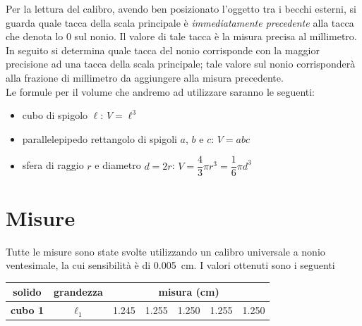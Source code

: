 \documentclass[12pt]{scrartcl}
\begin{document}
Per la lettura del calibro, avendo ben posizionato l'oggetto tra i becchi esterni,
si guarda quale tacca della scala principale è \emph{immediatamente precedente} alla
tacca che denota lo \(0\) sul nonio. Il valore di tale tacca è la misura precisa al
millimetro. In seguito si determina quale tacca del nonio corrisponde con la maggior
precisione ad una tacca della scala principale; tale valore sul nonio corrisponderà
alla frazione di millimetro da aggiungere alla misura precedente.\\[1em]
Le formule per il volume che andremo ad utilizzare saranno le seguenti:

\begin{itemize}
  \item cubo di spigolo \(\ell\):\hspace{5mm} \(V = \ell^3\)
  \item parallelepipedo rettangolo di spigoli \(a\), \(b\) e \(c\):\hspace{5mm} \(V = abc\)
  \item sfera di raggio \(r\) e diametro \(d = 2r\):\hspace{5mm} \(V = \dfrac{4}{3} \pi r^3 = \dfrac{1}{6} \pi d^3\)
\end{itemize}


\section{Misure}

Tutte le misure sono state svolte utilizzando un calibro universale a nonio ventesimale,
la cui sensibilità è di \SI{0.005}{\centi\metre}. I valori ottenuti sono i seguenti

\begin{tabular}{ccccccc}
  \toprule
  \textbf{solido} & \textbf{grandezza} & \multicolumn{5}{c}{\textbf{misura} (\si{\centi\metre})} \\
  \midrule
  \textbf{cubo 1} & \(\ell_1\) & \num{1.245} & \num{1.255} & \num{1.250} & \num{1.255} & \num{1.250} \\
  \bottomrule
\end{tabular}
\end{document}

